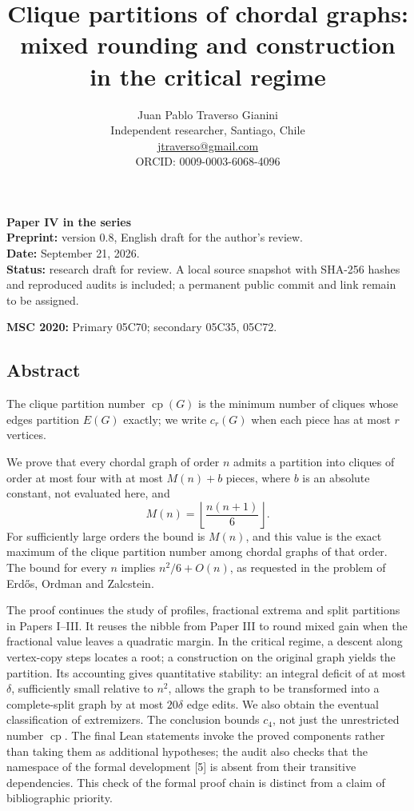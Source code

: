 \documentclass[english,11pt,a4paper]{article}
\title{Clique partitions of chordal graphs:\\mixed rounding and construction in the critical regime}
\author{Juan Pablo Traverso Gianini\\
\small Independent researcher, Santiago, Chile\\
\small \href{mailto:jtraverso@gmail.com}{jtraverso@gmail.com}\\
\small ORCID: 0009-0003-6068-4096}
\date{}
\begin{document}
\raggedbottom
\maketitle
\textbf{Paper IV in the series}\\
\textbf{Preprint:} version 0.8, English draft for the author's review.\\
\textbf{Date:} September 21, 2026.\\
\textbf{Status:} research draft for review. A local source snapshot with SHA-256 hashes and reproduced audits is included; a permanent public commit and link remain to be assigned.

\textbf{MSC 2020:} Primary 05C70; secondary 05C35, 05C72.

\subsection{Abstract}\label{abstract}

The clique partition number \(\operatorname{cp}(G)\) is the minimum number of cliques whose edges partition \(E(G)\) exactly; we write \(c_r(G)\) when each piece has at most \(r\) vertices.

We prove that every chordal graph of order \(n\) admits a partition into cliques of order at most four with at most \(M(n)+b\) pieces, where \(b\) is an absolute constant, not evaluated here, and \[
M(n)=\left\lfloor\frac{n(n+1)}6\right\rfloor.
\] For sufficiently large orders the bound is \(M(n)\), and this value is the exact maximum of the clique partition number among chordal graphs of that order. The bound for every \(n\) implies \(n^2/6+O(n)\), as requested in the problem of Erdős, Ordman and Zalcstein.

The proof continues the study of profiles, fractional extrema and split partitions in Papers I--III. It reuses the nibble from Paper III to round mixed gain when the fractional value leaves a quadratic margin. In the critical regime, a descent along vertex-copy steps locates a root; a construction on the original graph yields the partition. Its accounting gives quantitative stability: an integral deficit of at most \(\delta\), sufficiently small relative to \(n^2\), allows the graph to be transformed into a complete-split graph by at most \(20\delta\) edge edits. We also obtain the eventual classification of extremizers. The conclusion bounds \(c_4\), not just the unrestricted number \(\operatorname{cp}\). The final Lean statements invoke the proved components rather than taking them as additional hypotheses; the audit also checks that the namespace of the formal development {[}5{]} is absent from their transitive dependencies. This check of the formal proof chain is distinct from a claim of bibliographic priority.
\end{document}

